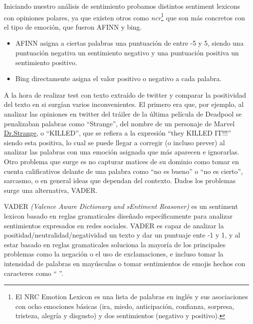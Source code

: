 \documentclass[
  letterpaper,
  DIV=11,
  numbers=noendperiod]{scrartcl}
\begin{document}
Iniciando nuestro análisis de sentimiento probamos distintos sentiment
lexicons con opiniones polares, ya que existen otros como
\emph{ncr}\footnote{El NRC Emotion Lexicon es una lista de palabras en inglés y sus asociaciones con ocho emociones básicas (ira, miedo, anticipación, confianza, sorpresa, tristeza, alegría y disgusto) y dos sentimientos (negativo y positivo).}
que son más concretos con el tipo de emoción, que fueron AFINN y bing.

\begin{itemize}
\item
  AFINN asigna a ciertas palabras una puntuación de entre -5 y 5, siendo
  una puntuación negativa un sentimiento negativo y una puntuación
  positiva un sentimiento positivo.
\item
  Bing directamente asigna el valor positivo o negativo a cada palabra.
\end{itemize}

A la hora de realizar test con texto extraído de twitter y comparar la
positividad del texto en si surgían varios inconvenientes. El primero
era que, por ejemplo, al analizar las opiniones en twitter del tráiler
de la última película de Deadpool se penalizaban palabras como
``Strange'', del nombre de un personaje de Marvel
\underline{Dr.Strange}, o ``KILLED'', que se refiera a la expresión
``they KILLED IT!!!'' siendo esta positiva, lo cual se puede llegar a
corregir (o incluso prever) al analizar las palabras con una emoción
asignada que más aparecen e ignorarlas. Otro problema que surge es no
capturar matices de su dominio como tomar en cuenta calificativos
delante de una palabra como ``no es bueno'' o ``no es cierto'',
sarcasmo, o en general ideas que dependan del contexto. Dados los
problemas surge una alternativa, VADER.

VADER \emph{(Valence Aware Dictionary and sEntiment Reasoner)} es un
sentiment lexicon basado en reglas gramaticales diseñado específicamente
para analizar sentimientos expresados en redes sociales. VADER es capaz
de analizar la positidad/neutralidad/negatividad un texto y dar un
puntuaje ente -1 y 1, y al estar basado en reglas gramaticales soluciona
la mayoría de los principales problemas como la negación o el uso de
exclamaciones, e incluso tomar la intensidad de palabras en mayúsculas o
tomar sentimientos de emojis hechos con caracteres como `` \text{:(} ''.
\end{document}
